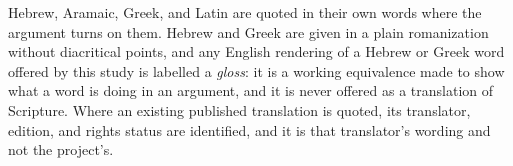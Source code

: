 Hebrew, Aramaic, Greek, and Latin are quoted in their own words where the
argument turns on them. Hebrew and Greek are given in a plain romanization
without diacritical points, and any English rendering of a Hebrew or Greek word
offered by this study is labelled a \emph{gloss}: it is a working equivalence
made to show what a word is doing in an argument, and it is never offered as a
translation of Scripture. Where an existing published translation is quoted,
its translator, edition, and rights status are identified, and it is that
translator's wording and not the project's.
